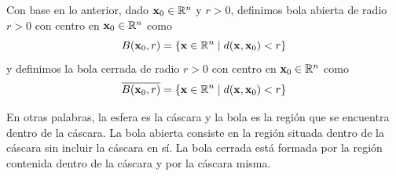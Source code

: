 \begin{definition}
    Con base en lo anterior, dado $\mathbf{x}_0 \in \RR[n]$ y $r > 0$, definimos bola abierta de radio $r > 0$ con centro en $\mathbf{x}_0 \in \RR[n]$ como
    $$B(\mathbf{x}_0, r) = \left\{ \mathbf{x} \in \RR[n] \mid d(\mathbf{x}, \mathbf{x}_0) < r \right\}$$
    y definimos la bola cerrada de radio $r > 0$ con centro en $\mathbf{x}_0 \in \RR[n]$ como
    $$\overline{B(\mathbf{x}_0, r)} = \left\{ \mathbf{x} \in \RR[n] \mid d(\mathbf{x}, \mathbf{x}_0) < r \right\}$$
\end{definition}

\newpage

En otras palabras, la esfera es la cáscara y la bola es la región que se encuentra dentro de la cáscara. La bola abierta consiste en la región situada dentro de la cáscara sin incluir la cáscara en sí. La bola cerrada está formada por la región contenida dentro de la cáscara y por la cáscara misma.


